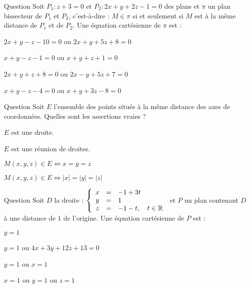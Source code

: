 \begin{multi}[multiple,feedback=
{\(M(x,y,z) \in \pi \Leftrightarrow |z+3|=\frac{|2x+y+2z-1|}{3}\).
}]{Question}
Soit  \(P_1 : z+3=0\) et \(P_2 : 2x+y+2z-1=0\) des plans et \(\pi\)  un plan bissecteur de \(P_1\) et \(P_2\), c'est-à-dire :   \(M \in \pi\)  si et seulement si \(M\) est  à la même distance de \(P_1\) et de  \(P_2\). Une équation cartésienne de \(\pi\) est :

    \item* \(2x+y-z-10=0\) ou \(2x+y+5z+8=0\)
    \item \(x+y-z-1=0\) ou \(x+y+z+1=0\)
    \item \(2x+y+z+8=0\) ou \(2x-y+5z+7=0\)
    \item \(x+y-z-4=0\) ou \(x+y+3z-8=0\)
\end{multi}


\begin{multi}[multiple,feedback=
{\(M(x,y,z) \in E \Leftrightarrow   \Vert \overrightarrow {OM} \wedge \vec{i} \Vert
=  \Vert \overrightarrow {OM} \wedge \vec{j} \Vert =  \Vert \overrightarrow {OM} \wedge \vec{k} \Vert\).
}]{Question}
Soit  \(E\) l'ensemble des points situés à la même distance  des axes de coordonnées. Quelles sont les assertions vraies ?

    \item \(E\) est une droite.
    \item* \(E\) est une réunion de droites.
    \item \(M(x,y,z) \in E \Leftrightarrow x=y=z\)
    \item* \(M(x,y,z) \in E \Leftrightarrow |x|=|y|=|z|\)
\end{multi}


\begin{multi}[multiple,feedback=
{Une représentation cartésienne de \(D\) est : \(\left\{\begin{array}{ccl}y&=&1\\x+3z+4&=&0  \end{array}\right.\). \(P\) est différent du plan \(x+3z+4=0\) et \(P\) contient \(D\), une équation cartésienne de \(P\) est donc de la forme : \((y-1)+\alpha(x+3z+4)=0\). On calcule \(\alpha\) de sorte que la distance de \(P\) à l'origine soit égale à \(1\).
}]{Question}
Soit  \(D\) la droite : \(\left\{\begin{array}{ccl}x&=&-1+3t\\y&=&1\\z&=&-1-t, \quad t\in \mathbb{R}  \end{array}\right.\) et \(P\) un plan contenant \(D\) à une distance de \(1\) de l'origine. Une équation cartésienne de \(P\) est :

    \item \(y=1\)
    \item* \(y=1\) ou \(4x+3y+12z+13=0\)
    \item \(y=1\) ou \(x=1\)
    \item \(x=1\) ou \(y=1\) ou \(z=1\)
\end{multi}
